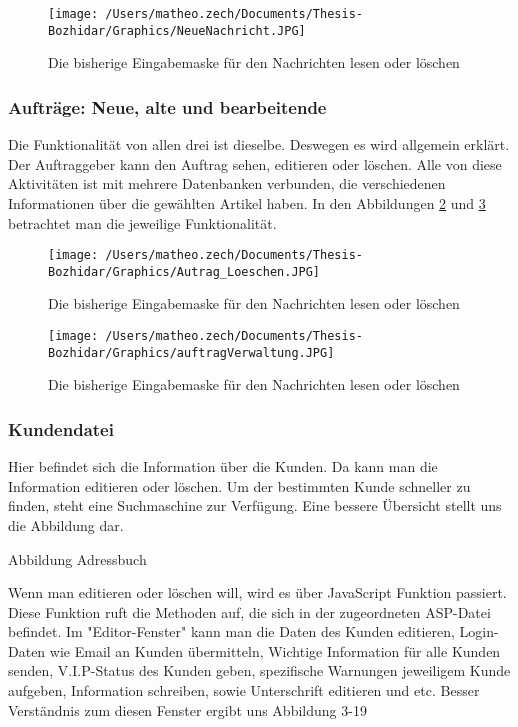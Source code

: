 \begin{figure}[h]
	\centering
	\texttt{[image: /Users/matheo.zech/Documents/Thesis-Bozhidar/Graphics/NeueNachricht.JPG]}
	\caption[Kommunikation]{Die bisherige Eingabemaske für den Nachrichten lesen oder löschen}
	\label{fig:Kommunikation}
\end{figure}



\subsubsection{Aufträge: Neue, alte und bearbeitende}

Die Funktionalität von allen drei ist dieselbe. Deswegen es wird allgemein erklärt. Der Auftraggeber kann den Auftrag sehen, editieren oder löschen. Alle von diese Aktivitäten ist mit mehrere Datenbanken verbunden, die verschiedenen Informationen über die gewählten Artikel haben. In den Abbildungen \ref{fig:Autrag_Loeschen} und \ref{fig:auftragEinsehen} betrachtet man die jeweilige Funktionalität.


\begin{figure}[h]
	\centering
	\texttt{[image: /Users/matheo.zech/Documents/Thesis-Bozhidar/Graphics/Autrag\_Loeschen.JPG]}
	\caption[AutragLoeschen]{Die bisherige Eingabemaske für den Nachrichten lesen oder löschen}
	\label{fig:Autrag_Loeschen}
\end{figure}
 
\begin{figure}[h] 
	\centering
	\texttt{[image: /Users/matheo.zech/Documents/Thesis-Bozhidar/Graphics/auftragVerwaltung.JPG]}
	\caption[auftragEinsehen]{Die bisherige Eingabemaske für den Nachrichten lesen oder löschen}
	\label{fig:auftragEinsehen}
\end{figure}

\pagebreak
\subsubsection{Kundendatei}

Hier befindet sich die Information über die Kunden. Da kann man die Information editieren oder löschen. Um der bestimmten Kunde schneller zu finden, steht eine Suchmaschine zur Verfügung. Eine bessere Übersicht stellt uns die Abbildung dar. 

Abbildung Adressbuch

Wenn man editieren oder löschen will, wird es über JavaScript Funktion passiert. Diese Funktion ruft die Methoden auf, die sich in der zugeordneten ASP-Datei befindet. Im "Editor-Fenster" kann man die Daten des Kunden editieren, Login-Daten wie Email an Kunden übermitteln, Wichtige Information für alle Kunden senden, V.I.P-Status des Kunden geben, spezifische Warnungen jeweiligem Kunde aufgeben, Information schreiben, sowie Unterschrift editieren und etc. Besser Verständnis zum diesen Fenster ergibt uns Abbildung 3-19

